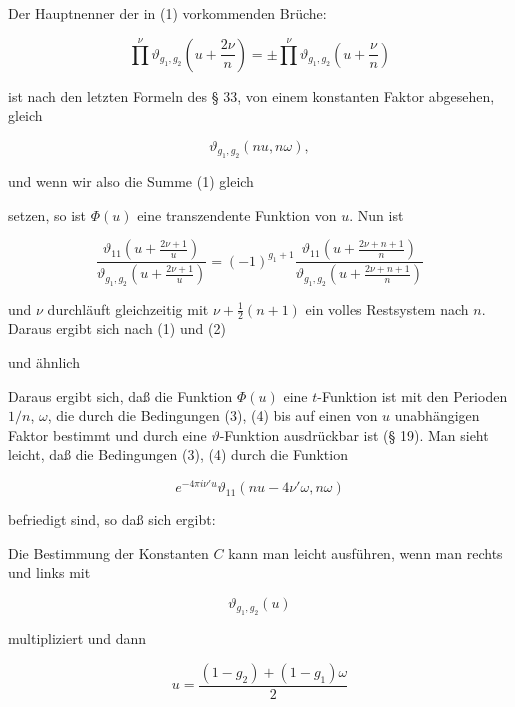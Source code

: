 
Der Hauptnenner der in (1) vorkommenden Brüche:

\[
\prod^{\nu} \vartheta_{g_1,g_2}\left(u + \frac{2\nu}{n}\right) = \pm \prod^{\nu} \vartheta_{g_1,g_2}\left(u + \frac{\nu}{n}\right)
\]

ist nach den letzten Formeln des § 33, von einem konstanten
Faktor abgesehen, gleich

\[
\vartheta_{g_1,g_2}(nu, n\omega),
\]

und wenn wir also die Summe (1) gleich


setzen, so ist $\Phi(u)$ eine  transzendente Funktion von $u$.
Nun ist

\[
\frac{\vartheta_{11}\left(u + \frac{2\nu+1}{u}\right)}{\vartheta_{g_1,g_2}\left(u + \frac{2\nu+1}{u}\right)} = (-1)^{g_1+1} \frac{\vartheta_{11}\left(u + \frac{2\nu+n+1}{n}\right)}{\vartheta_{g_1,g_2}\left(u + \frac{2\nu+n+1}{n}\right)}
\]

und $\nu$ durchläuft gleichzeitig mit $\nu + \frac{1}{2}(n+1)$ ein volles Restsystem nach $n$. Daraus ergibt sich nach (1) und (2)


und ähnlich


Daraus ergibt sich, daß die Funktion $\Phi(u)$ eine $t$-Funktion %
ist mit den Perioden $1/n$, $\omega$, die durch die Bedingungen (3), (4)
bis auf einen von $u$ unabhängigen Faktor bestimmt und durch
eine $\vartheta$-Funktion ausdrückbar ist (§ 19). Man sieht leicht, daß
die Bedingungen (3), (4) durch die Funktion

\[
e^{-4\pi i\nu' u} \vartheta_{11}(nu - 4\nu'\omega, n\omega)
\]

befriedigt sind, so daß sich ergibt:


Die Bestimmung der Konstanten $C$ kann man leicht ausführen, wenn man rechts und links mit

\[
\vartheta_{g_1,g_2}(u)
\]

multipliziert und dann

\[
u = \frac{(1-g_2) + (1-g_1)\omega}{2}
\]
